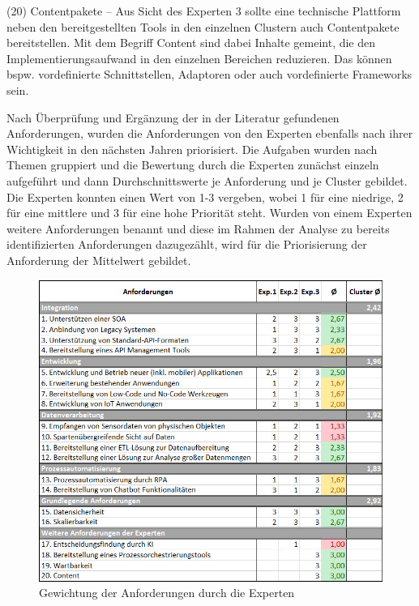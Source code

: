 (20) Contentpakete – Aus Sicht des Experten 3 sollte eine technische Plattform neben den bereitgestellten Tools in den einzelnen Clustern auch Contentpakete bereitstellen. Mit dem Begriff Content sind dabei Inhalte gemeint, die den Implementierungsaufwand in den einzelnen Bereichen reduzieren. Das können bspw. vordefinierte Schnittstellen, Adaptoren oder auch vordefinierte Frameworks sein. \autocite[Vgl.][]{SCHMIDT2023} 

Nach Überprüfung und Ergänzung der in der Literatur gefundenen Anforderungen, wurden die Anforderungen von den Experten ebenfalls nach ihrer Wichtigkeit in den nächsten Jahren priorisiert. Die Aufgaben wurden nach Themen gruppiert und die Bewertung durch die Experten zunächst einzeln aufgeführt und dann Durchschnittswerte je Anforderung und je Cluster gebildet. Die Experten konnten einen Wert von 1-3 vergeben, wobei 1 für eine niedrige, 2 für eine mittlere und 3 für eine hohe Priorität steht. Wurden von einem Experten weitere Anforderungen benannt und diese im Rahmen der Analyse zu bereits identifizierten Anforderungen dazugezählt, wird für die Priorisierung der Anforderung der Mittelwert gebildet.

\begin{figure}[h]
    \centering
    \includegraphics[width=1\textwidth]{img/Gewichtung_Anforderung2.jpg}
    \caption[Gewichtung der Anforderungen durch die Experten]{Gewichtung der Anforderungen durch die Experten\autocite{Gewichtung}}
    \label{fig:Gewichtung}
\end{figure}

